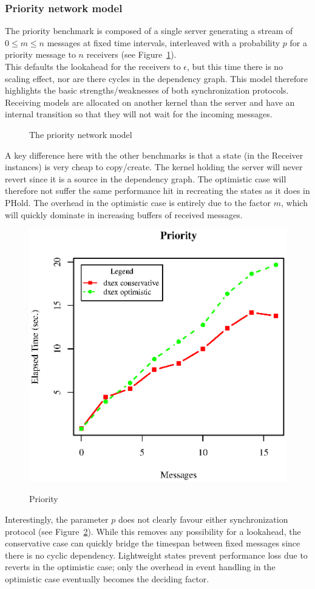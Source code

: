 \subsubsection{Priority network model}
The priority benchmark is composed of a single server generating a stream of $0\leq m \leq n$ messages at fixed time intervals, interleaved with a probability $p$ for a priority message to $n$ receivers (see Figure~\ref{fig:NetworkModel}).\\ This defaults the lookahead for the receivers to $\epsilon$, but this time there is no scaling effect, nor are there cycles in the dependency graph. This model therefore highlights the basic strengths/weaknesses of both synchronization protocols. Receiving models are allocated on another kernel than the server and have an internal transition so that they will not wait for the incoming messages.
\begin{center}
\begin{figure}

\caption{The priority network model}
\label{fig:NetworkModel}
\end{figure}
\end{center}
A key difference here with the other benchmarks is that a state (in the Receiver instances) is very cheap to copy/create. The kernel holding the server will never revert since it is a source in the dependency graph. The optimistic case will therefore not suffer the same performance hit in recreating the states as it does in PHold. The overhead in the optimistic case is entirely due to the factor $m$, which will quickly dominate in increasing buffers of received messages.
\begin{figure}[ltbh]
	\includegraphics[width=.5\textwidth]{fig/fig5.eps}
	\label{fig:Priority}
	\caption{Priority}
\end{figure}
Interestingly, the parameter $p$ does not clearly favour either synchronization protocol (see Figure~\ref{fig:Priority}). While this removes any possibility for a lookahead, the conservative case can quickly bridge the timespan between fixed messages since there is no cyclic dependency. Lightweight states prevent performance loss due to reverts in the optimistic case; only the overhead in event handling in the optimistic case eventually becomes the deciding factor.

